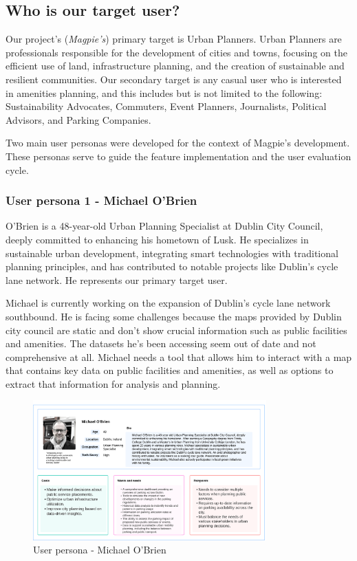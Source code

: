 \documentclass[preview]{standalone}
\begin{document}
\subsection{Who is our target user?}
Our project's (\textit{Magpie's}) primary target is Urban Planners. Urban
Planners are professionals responsible for the development of cities and towns,
focusing on the efficient use of land, infrastructure planning, and the creation
of sustainable and resilient communities. Our secondary target is any casual
user who is interested in amenities planning, and this includes but is not
limited to the following: Sustainability Advocates, Commuters, Event Planners,
Journalists, Political Advisors, and Parking Companies.

Two main user personas were developed for the context of Magpie's development.
These personas serve to guide the feature implementation and the user evaluation
cycle.

\subsubsection{User persona 1 - Michael O'Brien}
O'Brien is a 48-year-old Urban Planning Specialist at Dublin City Council,
deeply committed to enhancing his hometown of Lusk. He specializes in
sustainable urban development, integrating smart technologies with traditional
planning principles, and has contributed to notable projects like Dublin's cycle
lane network. He represents our primary target user.

Michael is currently working on the expansion of Dublin's cycle lane network
southbound. He is facing some challenges because the maps provided by Dublin
city council are static and don't show crucial information such as public
facilities and amenities. The datasets he's been accessing seem out of date and
not comprehensive at all. Michael needs a tool that allows him to interact with
a map that contains key data on public facilities and amenities, as well as
options to extract that information for analysis and planning.

\begin{figure}[htbp]
    \centering{}{}
    \includegraphics[width=0.8\textwidth]{images/michael-obrien-userpersona.png}
    \caption{User persona - Michael O'Brien}
\end{figure}
\end{document}
